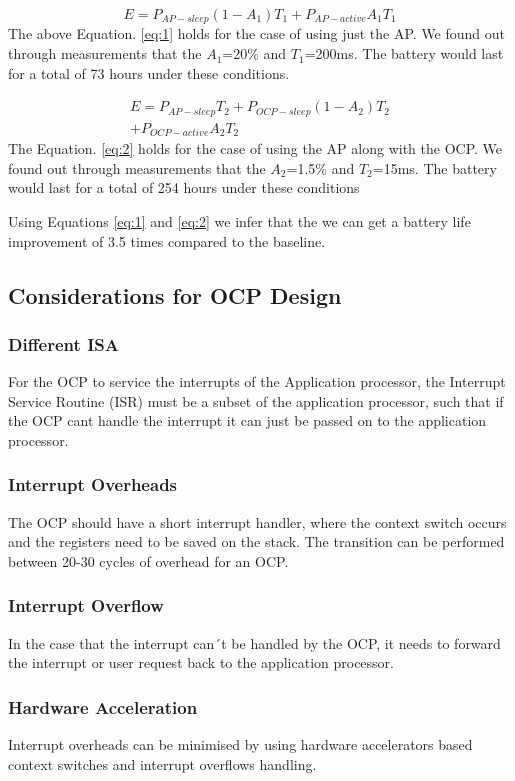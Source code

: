 \documentclass[conference]{IEEEtran}
\begin{document}
\begin{equation} \label{eq:1}
    E = P_{AP-sleep}(1-A_1)T_1 + P_{AP-active}A_1T_1
\end{equation}
The above Equation. \ref{eq:1} holds for the case of using just the AP. We found out through measurements that the $A_1$=20\% and $T_1$=200ms. The battery would last for a total of 73 hours under these conditions.

\begin{multline} \label{eq:2}
    E = P_{AP-sleep}T_2 + P_{OCP-sleep}(1-A_2)T_2 \\
    + P_{OCP-active}A_2T_2
\end{multline}
The Equation. \ref{eq:2} holds for the case of using the AP along with the OCP. We found out through measurements that the $A_2$=1.5\% and $T_2$=15ms. The battery would last for a total of 254 hours under these conditions

Using Equations \ref{eq:1} and \ref{eq:2} we infer that the we can get a battery life improvement of 3.5 times compared to the baseline.
\subsection{Considerations for OCP Design}
\subsubsection{Different ISA}
For the OCP to service the interrupts of the Application processor, the
Interrupt Service Routine (ISR) must be a subset of the application processor,
such that if the OCP cant handle the interrupt it can just be passed on to the
application processor.
\subsubsection{Interrupt Overheads}
The OCP should have a short interrupt handler, where the context switch
occurs and the registers need to be saved on the stack. The transition can be
performed between 20-30 cycles of overhead for an OCP.
\subsubsection{Interrupt Overflow}
In the case that the interrupt can´t be handled by the OCP, it needs to forward the interrupt or user request back to the application processor.
\subsubsection{Hardware Acceleration}
Interrupt overheads can be minimised by using hardware accelerators based
context switches and interrupt overflows handling.
\end{document}
